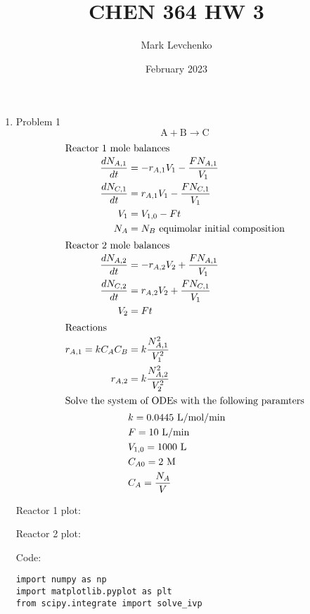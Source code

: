 \documentclass[12pt]{article}
\title{CHEN 364 HW 3}
\author{Mark Levchenko}
\date{February 2023}
\begin{document}
\begin{enumerate}
 
\newpage
    \item Problem 1
    \[
        \mathrm{A} + \mathrm{B} \rightarrow \mathrm{C}  
    \]
    \begin{align*}
        \intertext{Reactor 1 mole balances}
        \frac{dN_{A,1}}{dt} &= -r_{A,1} V_1 - \frac{F N_{A,1}}{V_1} \\
        \frac{dN_{C,1}}{dt} &= r_{A,1} V_1 - \frac{F N_{C,1}}{V_1} \\
        V_1 &= V_{1,0} - F t \\
        N_A &= N_B \text{ equimolar initial composition} \\
        \intertext{Reactor 2 mole balances}
        \frac{dN_{A,2}}{dt} &= -r_{A,2} V_2 + \frac{F N_{A,1}}{V_1} \\
        \frac{dN_{C,2}}{dt} &= r_{A,2} V_2 + \frac{F N_{C,1}}{V_1} \\
        V_2 &= F t \\
        \intertext{Reactions}
        r_{A,1} = k C_A C_B &= k \frac{N_{A,1}^2}{V_1^2} \\ 
        r_{A,2} &= k \frac{N_{A,2}^2}{V_2^2} \\ 
        \intertext{Solve the system of ODEs with the following paramters}
        & k = 0.0445 \text{ L/mol/min} \\
        & F = 10 \text{ L/min} \\
        & V_{1,0} = 1000 \text{ L} \\
        & C_{A0} = 2 \text{ M} \\
        & C_A = \frac{N_A}{V}
    \end{align*}

    Reactor 1 plot:

    \begin{center}
        
    \end{center}

    Reactor 2 plot:

    \begin{center}
        
    \end{center}

    Code:

\begin{verbatim}
import numpy as np
import matplotlib.pyplot as plt
from scipy.integrate import solve_ivp


\end{verbatim}
\end{enumerate}
\end{document}
